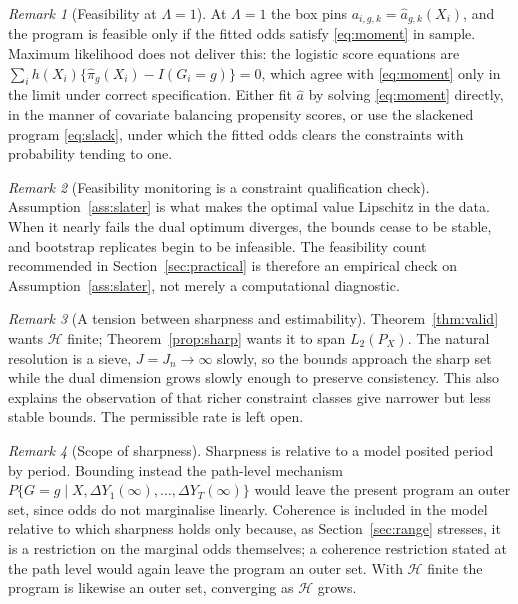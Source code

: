 \documentclass[12pt]{article}
\theoremstyle{remark}
\newtheorem{remark}{Remark}
\begin{document}
\begin{remark}[Feasibility at $\Lambda = 1$]
\label{rmk:lambda1}
At $\Lambda = 1$ the box pins $a_{i,g,k} = \widehat a_{g,k}(X_i)$, and the program is
feasible only if the fitted odds satisfy \eqref{eq:moment} in sample. Maximum likelihood
does not deliver this: the logistic score equations are
$\sum_i h(X_i)\{\widehat\pi_g(X_i) - I(G_i{=}g)\} = 0$, which agree with \eqref{eq:moment}
only in the limit under correct specification. Either fit $\widehat a$ by solving
\eqref{eq:moment} directly, in the manner of covariate balancing propensity scores, or use
the slackened program \eqref{eq:slack}, under which the fitted odds clears the constraints
with probability tending to one.
\end{remark}

\begin{remark}[Feasibility monitoring is a constraint qualification check]
\label{rmk:feas}
Assumption~\ref{ass:slater} is what makes the optimal value Lipschitz in the data. When it
nearly fails the dual optimum diverges, the bounds cease to be stable, and bootstrap
replicates begin to be infeasible. The feasibility count recommended in
Section~\ref{sec:practical} is therefore an empirical check on
Assumption~\ref{ass:slater}, not merely a computational diagnostic.
\end{remark}

\begin{remark}[A tension between sharpness and estimability]
\label{rmk:tension}
Theorem~\ref{thm:valid} wants $\mathcal{H}$ finite; Theorem~\ref{prop:sharp} wants it to
span $L_2(P_X)$. The natural resolution is a sieve, $J = J_n \to \infty$ slowly, so the
bounds approach the sharp set while the dual dimension grows slowly enough to preserve
consistency. This also explains the observation of \citet{tang2025simple} that richer
constraint classes give narrower but less stable bounds. The permissible rate is left
open.
\end{remark}

\begin{remark}[Scope of sharpness]
\label{rmk:sharpscope}
Sharpness is relative to a model posited period by period. Bounding instead the path-level
mechanism $P\{G{=}g \mid X, \Delta Y_1(\infty), \ldots, \Delta Y_T(\infty)\}$ would leave
the present program an outer set, since odds do not marginalise linearly. Coherence is
included in the model relative to which sharpness holds only because, as
Section~\ref{sec:range} stresses, it is a restriction on the marginal odds themselves; a
coherence restriction stated at the path level would again leave the program an outer
set. With $\mathcal{H}$ finite the program is likewise an outer set, converging as
$\mathcal{H}$ grows.
\end{remark}
\end{document}
